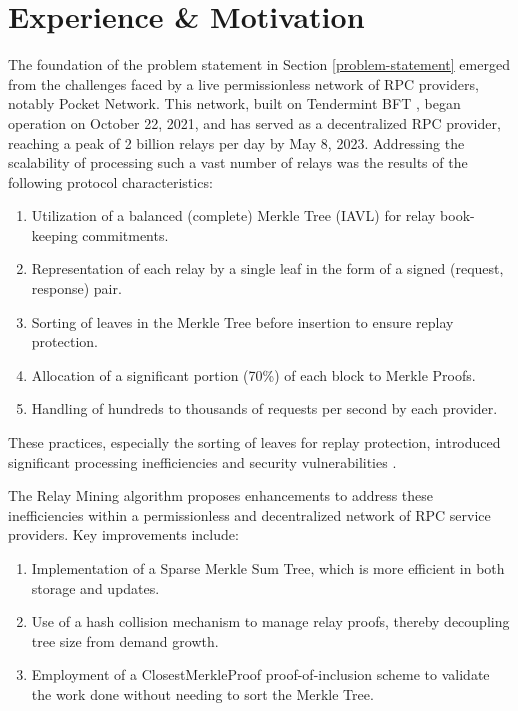 \documentclass[runningheads]{llncs}
\begin{document}
\section{Experience \& Motivation}

The foundation of the problem statement in Section \ref{problem-statement} emerged from the challenges faced by a live permissionless network of RPC providers, notably Pocket Network. This network, built on Tendermint BFT \cite{tendermint}, began operation on October 22, 2021, and has served as a decentralized RPC provider, reaching a peak of 2 billion relays per day by May 8, 2023. Addressing the scalability of processing such a vast number of relays was the results of the following protocol characteristics:

\begin{enumerate}
    \item Utilization of a balanced (complete) Merkle Tree (IAVL) for relay book-keeping commitments. ~\cite{githubIAVL}
    \item Representation of each relay by a single leaf in the form of a signed (request, response) pair.
    \item Sorting of leaves in the Merkle Tree before insertion to ensure replay protection.
    \item Allocation of a significant portion (70\%) of each block to Merkle Proofs.
    \item Handling of hundreds to thousands of requests per second by each provider.
\end{enumerate}

These practices, especially the sorting of leaves for replay protection, introduced significant processing inefficiencies and security vulnerabilities \cite{alin2023sortedleaves}.

The Relay Mining algorithm proposes enhancements to address these inefficiencies within a permissionless and decentralized network of RPC service providers. Key improvements include:

\begin{enumerate}
    \item Implementation of a Sparse Merkle Sum Tree, which is more efficient in both storage and updates.
    \item Use of a hash collision mechanism to manage relay proofs, thereby decoupling tree size from demand growth.
    \item Employment of a ClosestMerkleProof proof-of-inclusion scheme to validate the work done without needing to sort the Merkle Tree.
\end{enumerate}
\end{document}
